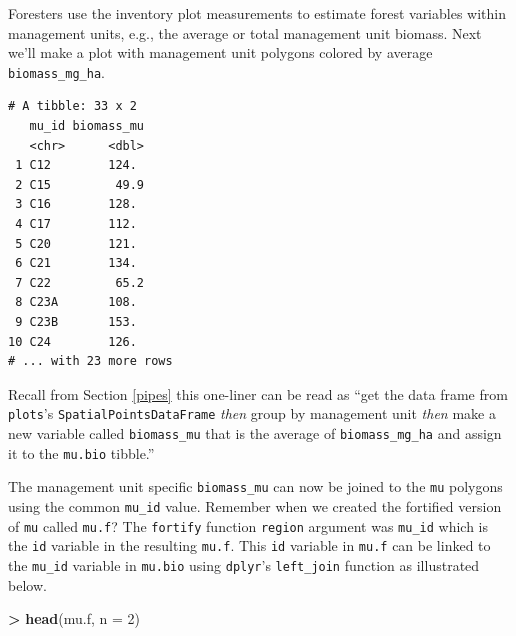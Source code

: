 \documentclass[]{krantz}
\makeatletter
\newenvironment{Shaded}{\begin{snugshade}}{\end{snugshade}}
\newcommand{\KeywordTok}[1]{\textcolor[rgb]{0.27,0.27,0.27}{\textbf{#1}}}
\newcommand{\DataTypeTok}[1]{\textcolor[rgb]{0.27,0.27,0.27}{#1}}
\newcommand{\DecValTok}[1]{\textcolor[rgb]{0.06,0.06,0.06}{#1}}
\newcommand{\StringTok}[1]{\textcolor[rgb]{0.5,0.5,0.5}{#1}}
\newcommand{\OperatorTok}[1]{\textcolor[rgb]{0.43,0.43,0.43}{\textbf{#1}}}
\newcommand{\NormalTok}[1]{#1}
\newenvironment{kframe}{%
\medskip{}
\setlength{\fboxsep}{.8em}
 \def\at@end@of@kframe{}%
 \ifinner\ifhmode%
  \def\at@end@of@kframe{\end{minipage}}%
  \begin{minipage}{\columnwidth}%
 \fi\fi%
 \def\FrameCommand##1{\hskip\@totalleftmargin \hskip-\fboxsep
 \colorbox{shadecolor}{##1}\hskip-\fboxsep
     \hskip-\linewidth \hskip-\@totalleftmargin \hskip\columnwidth}%
 \MakeFramed {\advance\hsize-\width
   \@totalleftmargin\z@ \linewidth\hsize
   \@setminipage}}%
 {\par\unskip\endMakeFramed%
 \at@end@of@kframe}
\renewenvironment{Shaded}{\begin{kframe}}{\end{kframe}}
\theoremstyle{definition}
\theoremstyle{definition}
\theoremstyle{definition}
\theoremstyle{remark}
\makeatother
\begin{document}
Foresters use the inventory plot measurements to estimate forest
variables within management units, e.g., the average or total management
unit biomass. Next we'll make a plot with management unit polygons
colored by average \texttt{biomass\_mg\_ha}.

\begin{Shaded}
\end{Shaded}

\begin{verbatim}
# A tibble: 33 x 2
   mu_id biomass_mu
   <chr>      <dbl>
 1 C12        124. 
 2 C15         49.9
 3 C16        128. 
 4 C17        112. 
 5 C20        121. 
 6 C21        134. 
 7 C22         65.2
 8 C23A       108. 
 9 C23B       153. 
10 C24        126. 
# ... with 23 more rows
\end{verbatim}

Recall from Section \ref{pipes} this one-liner can be read as ``get the
data frame from \texttt{plots}'s \texttt{SpatialPointsDataFrame}
\emph{then} group by management unit \emph{then} make a new variable
called \texttt{biomass\_mu} that is the average of
\texttt{biomass\_mg\_ha} and assign it to the \texttt{mu.bio} tibble.''

The management unit specific \texttt{biomass\_mu} can now be joined to
the \texttt{mu} polygons using the common \texttt{mu\_id} value.
Remember when we created the fortified version of \texttt{mu} called
\texttt{mu.f}? The \texttt{fortify} function \texttt{region} argument
was \texttt{mu\_id} which is the \texttt{id} variable in the resulting
\texttt{mu.f}. This \texttt{id} variable in \texttt{mu.f} can be linked
to the \texttt{mu\_id} variable in \texttt{mu.bio} using
\texttt{dplyr}'s \texttt{left\_join} function as illustrated below.

\begin{Shaded}
\begin{Highlighting}[]
\OperatorTok{>}\StringTok{ }\KeywordTok{head}\NormalTok{(mu.f, }\DataTypeTok{n =} \DecValTok{2}\NormalTok{)}
\end{Highlighting}
\end{Shaded}
\end{document}
